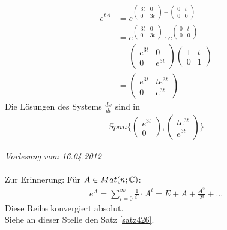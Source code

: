 \begin{align}
e^{tA} &=  e^{\begin{pmatrix} 3t & 0 \\ 0 & 3t\end{pmatrix} + \begin{pmatrix} 0 & t \\ 0 & 0\end{pmatrix}} \\
&= e^{\begin{pmatrix} 3t & 0 \\ 0 & 3t\end{pmatrix}} \cdot e^{\begin{pmatrix} 0 & t \\ 0 & 0\end{pmatrix}} \\
&= \begin{pmatrix} e^{3t} & 0 \\ 0 & e^{3t}\end{pmatrix}\begin{pmatrix} 1 & t \\ 0 & 1\end{pmatrix} \\
&= \begin{pmatrix} e^{3t} & te^{3t} \\ 0 & e^{3t}\end{pmatrix}
\end{align}
Die Lösungen des Systems $\frac{dx}{dt}$ sind in
\begin{align}
Span\{\begin{pmatrix} e^{3t} \\ 0 \end{pmatrix}, \begin{pmatrix} t e^{3t} \\ e^{3t }\end{pmatrix}\}
\end{align}


\newpage
\noindent \textit{Vorlesung vom 16.04.2012} \\\\
\f{Zur Erinnerung}: Für $A \in Mat(n; \mathbb{C})$:
\begin{align}
e^A = \sum_{i=0}^{\infty} \frac{1}{i!} \cdot A^i = E + A + \frac{A^2}{2!} + ...
\end{align}
Diese Reihe konvergiert absolut. \\
Siehe an dieser Stelle den Satz \ref{satz426}.

